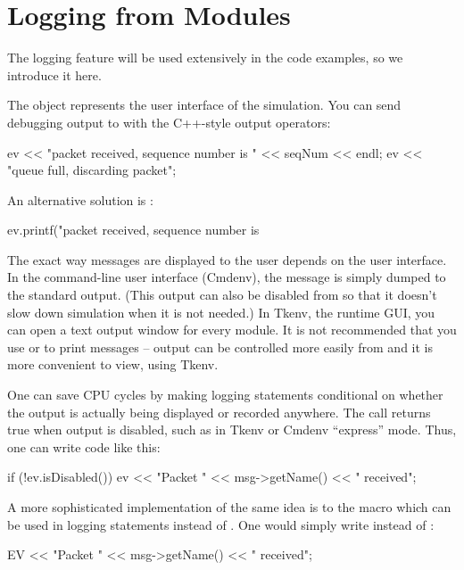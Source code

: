 \section{Logging from Modules}

The logging feature will be used extensively in the code examples, so
we introduce it here.

The  object represents the user interface of the
simulation.  You can send debugging output to  with the C++-style
output operators:

\begin{cpp}
ev << "packet received, sequence number is " << seqNum << endl;
ev << "queue full, discarding packet\n";
\end{cpp}

An alternative solution is :

\begin{cpp}
ev.printf("packet received, sequence number is %
\end{cpp}

The exact way messages are displayed to the user depends on the user
interface. In the command-line user interface (Cmdenv),
the message is simply dumped to the standard output. (This output can also be
disabled from  so that it doesn't slow down simulation
when it is not needed.) In Tkenv, the runtime GUI, you can open
a text output window for every module.
It is not recommended that you use  or 
to print messages --  output can be controlled more easily
from  and it is more convenient to view, using Tkenv.

One can save CPU cycles by making logging statements conditional
on whether the output is actually being displayed or recorded anywhere.
The  call returns true when  output is disabled,
such as in Tkenv or Cmdenv ``express'' mode. Thus, one can write code like
this:

\begin{cpp}
if (!ev.isDisabled())
    ev << "Packet " << msg->getName() << " received\n";
\end{cpp}

A more sophisticated implementation of the same idea is to the 
macro which can be used in logging statements instead of .
One would simply write  instead of :

\begin{cpp}
EV << "Packet " << msg->getName() << " received\n";
\end{cpp}

